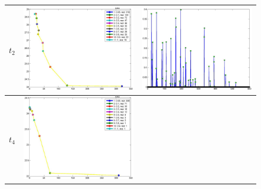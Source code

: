 \documentclass[english]{siamltex}
\begin{document}
{\begin{figure}[!h]
\begin{center}
\begin{tabular}{|c|c|c|}
			\hline
			$t_2$
			&	
			\includegraphics[width=.8\iwidth]{figures/newFigs/exp3paretoWeights}
			&
			\includegraphics[width=.8\iwidth]{figures/newFigs/exp3Weights}\\
			\hline
			$t_4$
			&	
			\includegraphics[width=.8\iwidth]{figures/newFigs/exp5paretoWeights}

\end{tabular}
\end{center}
\end{figure}}
\end{document}
